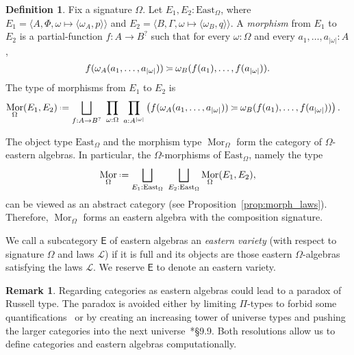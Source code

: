 \documentclass{amsart}
\newcommand{\acat}[1]{\mathsf{#1}}
\numberwithin{lstfloat}{section}
\DeclareMathOperator{\ftor}{Mor}
\newcommand{\type}[1]{#1}
\newcommand{\East}{\mathrm{East}}
\newcommand{\defeq}{\mathrel{\hstretch{.13}{=}\hspace{.2ex}{=}}}
\newcommand{\venturi}{%
  \mathrel{
    \begin{tikzpicture}[yscale=0.6,xscale=0.5]
        \draw (0ex,2.5ex) to (1ex,2ex);
        \draw (1ex,2ex) to (3ex,2ex);
        \draw (0ex,0.75ex) to (1ex,1.25ex);
        \draw (1ex,1.25ex) to (3ex,1.25ex);
    \end{tikzpicture}
  }
}
\theoremstyle{definition}
\newtheorem{defn}[thm]{Definition}
\newtheorem{rem}[thm]{Remark}
\theoremstyle{remark}
\numberwithin{equation}{section}
\begin{document}
\begin{defn}\label{def:mor-Omega}
  Fix a signature $\Omega$. Let $E_1,E_2:\East_\Omega$, where $E_1 = \langle A, \Phi,
  \omega \mapsto \langle \omega_A , p\rangle\rangle$ and $E_2 = \langle B, \Gamma,
  \omega \mapsto \langle \omega_B , q \rangle\rangle$. A \emph{morphism} from
  $E_1$ to $E_2$ is a partial-function $f:A\to B^?$ such that for every 
  $\omega:\Omega$ and every $a_1,\ldots, a_{|\omega|}:A$,
  \begin{align*} 
    f(\omega_{\type{A}}(a_1,\ldots,a_{|\omega|}))
      \venturi 
    \omega_{\type{B}}(f(a_1),\ldots,f(a_{|\omega|})).
  \end{align*}
  The type of morphisms from $E_1$ to $E_2$ is 
  \begin{align*}
    \ftor_{\Omega}(E_1, E_2) &\defeq \bigsqcup_{f : A \to B^?} ~\prod_{\omega : \Omega} ~\prod_{a: A^{|\omega|}}\left(f(\omega_{\type{A}}(a_1,\ldots,a_{|\omega|}))
    \venturi 
  \omega_{\type{B}}(f(a_1),\ldots,f(a_{|\omega|}))\right) .
  \end{align*}
\end{defn}

The object type $\East_{\Omega}$ and the morphism type $\ftor_{\Omega}$ form the
category of $\Omega$-eastern algebras. In particular, the
$\Omega$-morphisms of $\East_\Omega$, namely the type 
\[ 
  \ftor_{\Omega} \defeq \bigsqcup_{E_1 : \East_\Omega}~\bigsqcup_{E_2 : \East_\Omega} \ftor_{\Omega}(E_1,E_2),
\] 
can be viewed as an abstract category (see Proposition~\ref{prop:morph_laws}). Therefore,
$\ftor_{\Omega}$ forms an eastern algebra with the composition signature.

We call a subcategory $\acat{E}$ of eastern algebras an \emph{eastern variety}
(with respect to signature $\Omega$ and laws $\mathcal{L}$) if it is full and
its objects are those eastern $\Omega$-algebras satisfying the laws
$\mathcal{L}$. We reserve $\acat{E}$ to denote an eastern variety.

\begin{rem}
  \label{rem:[paradox]} Regarding categories as eastern algebras could lead to a
  paradox of Russell type.
  The paradox is avoided either by limiting $\Pi$-types to forbid some
  quantifications~\cite{Tucker} or by creating an increasing tower of universe
  types and pushing the larger categories into the next
  universe~\cite{HoTT}*{\S9.9}.  Both resolutions allow us to define
  categories and eastern algebras computationally.
\end{rem}
\end{document}
